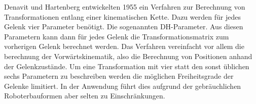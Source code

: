 \label{dh-p}

Denavit und Hartenberg entwickelten 1955 ein Verfahren zur Berechnung von 
Transformationen entlang einer kinematischen Kette. Dazu werden für jedes 
Gelenk vier Parameter benötigt. Die sogenannten \ac{DH-Parameter}. Aus diesen
Parametern kann dann für jedes Gelenk die Transformationsmatrix zum vorherigen 
Gelenk berechnet werden. Das Verfahren vereinfacht vor allem die berechnung 
der Vorwärtskinematik, also die Berechnung von Positionen anhand der 
Gelenkzustände. Um eine Transformation mit vier statt den sonst üblichen 
sechs Parametern zu beschreiben werden die möglichen Freiheitsgrade der Gelenke
limitiert. In der Anwendung führt dies aufgrund der gebräuchlichen Roboterbauformen
aber selten zu Einschränkungen.
